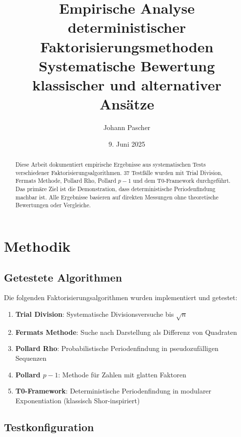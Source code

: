 \documentclass[12pt,a4paper]{article}
\title{Empirische Analyse deterministischer Faktorisierungsmethoden \\
	\large Systematische Bewertung klassischer und alternativer Ansätze}
\author{Johann Pascher}
\date{9. Juni 2025}
\begin{document}
	
	\maketitle
	
	\begin{abstract}
		Diese Arbeit dokumentiert empirische Ergebnisse aus systematischen Tests verschiedener Faktorisierungsalgorithmen. 37 Testfälle wurden mit Trial Division, Fermats Methode, Pollard Rho, Pollard $p-1$ und dem T0-Framework durchgeführt. Das primäre Ziel ist die Demonstration, dass deterministische Periodenfindung machbar ist. Alle Ergebnisse basieren auf direkten Messungen ohne theoretische Bewertungen oder Vergleiche.
	\end{abstract}
	
	\tableofcontents
	\newpage
	
	\section{Methodik}
	
	\subsection{Getestete Algorithmen}
	
	Die folgenden Faktorisierungsalgorithmen wurden implementiert und getestet:
	
	\begin{enumerate}
		\item \textbf{Trial Division}: Systematische Divisionsversuche bis $\sqrt{n}$
		\item \textbf{Fermats Methode}: Suche nach Darstellung als Differenz von Quadraten
		\item \textbf{Pollard Rho}: Probabilistische Periodenfindung in pseudozufälligen Sequenzen
		\item \textbf{Pollard $p-1$}: Methode für Zahlen mit glatten Faktoren
		\item \textbf{T0-Framework}: Deterministische Periodenfindung in modularer Exponentiation (klassisch Shor-inspiriert)
	\end{enumerate}
	
	\subsection{Testkonfiguration}
	
\end{document}
